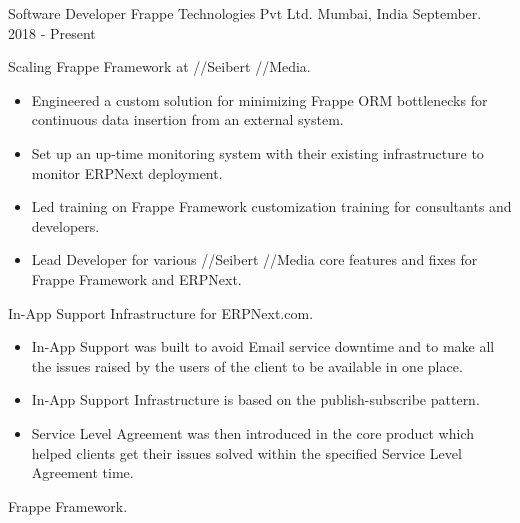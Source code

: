 

\begin{cventries}

  \cventry
    {Software Developer} %
    {Frappe Technologies Pvt Ltd.} %
    {Mumbai, India} %
    {September. 2018 - Present} %
    {
      \begin{cvitems} %
        \item {Scaling Frappe Framework at //Seibert //Media.}
            \begin{itemize}
                \item {Engineered a custom solution for minimizing Frappe ORM bottlenecks for continuous data insertion from an external system.}
                \item {Set up an up-time monitoring system with their existing infrastructure to monitor ERPNext deployment.}
                \item {Led training on Frappe Framework customization training for consultants and developers.}
                \item {Lead Developer for various //Seibert //Media core features and fixes for Frappe Framework and ERPNext.}
            \end{itemize}
        \item {In-App Support Infrastructure for ERPNext.com.}
            \begin{itemize}
                \item {In-App Support was built to avoid Email service downtime and to make all the issues raised by the users of the client to be available in one place.}
                \item {In-App Support Infrastructure is based on the publish-subscribe pattern.}
                \item {Service Level Agreement was then introduced in the core product which helped clients get their issues solved within the specified Service Level Agreement time.}
            \end{itemize}
        \item {Frappe Framework.}

\end{cvitems}}
\end{cventries}
